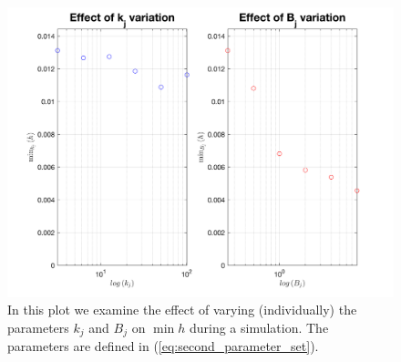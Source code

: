 \documentclass{amsart}
\theoremstyle{definition}
\theoremstyle{remark}
\numberwithin{equation}{section}
\begin{document}
\begin{figure}[h]
	\centering
	\includegraphics[width=1.0\textwidth]{fig_effect_on_minh_kj_Bj}	
	\caption{\label{fig:effect_Bj_kj_minh}  In this plot we
		examine the effect of varying (individually) the parameters $k_j$ and $B_j$ on $\min{h}$ during a simulation. The parameters are defined in (\ref{eq:second_parameter_set}). }
\end{figure}





\end{document}
